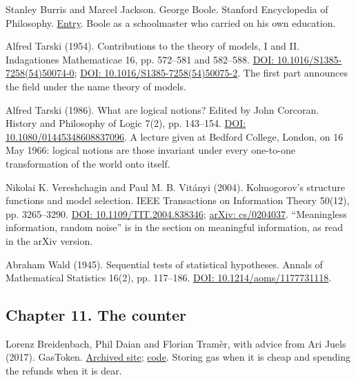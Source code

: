 \documentclass[11pt,twoside]{article}
\theoremstyle{thielethm}
\theoremstyle{thieledef}
\theoremstyle{thieledef}
\theoremstyle{thieledef}
\theoremstyle{thielethm}
\theoremstyle{thieleobs}
\theoremstyle{thielethm}
\begin{document}
\noindent Stanley Burris and Marcel Jackson. George Boole. Stanford Encyclopedia of Philosophy. \href{https://plato.stanford.edu/entries/boole/}{Entry}. Boole as a schoolmaster who carried on his own education.
\par\medskip

\noindent Alfred Tarski (1954). Contributions to the theory of models, I and II. Indagationes Mathematicae 16, pp. 572--581 and 582--588. \href{https://doi.org/10.1016/S1385-7258(54)50074-0}{DOI: 10.1016/S1385-7258(54)50074-0}; \href{https://doi.org/10.1016/S1385-7258(54)50075-2}{DOI: 10.1016/S1385-7258(54)50075-2}. The first part announces the field under the name theory of models.
\par\medskip

\noindent Alfred Tarski (1986). What are logical notions? Edited by John Corcoran. History and Philosophy of Logic 7(2), pp. 143--154. \href{https://doi.org/10.1080/01445348608837096}{DOI: 10.1080/01445348608837096}. A lecture given at Bedford College, London, on 16 May 1966: logical notions are those invariant under every one-to-one transformation of the world onto itself.
\par\medskip

\noindent Nikolai K. Vereshchagin and Paul M. B. Vit\'anyi (2004). Kolmogorov's structure functions and model selection. IEEE Transactions on Information Theory 50(12), pp. 3265--3290. \href{https://doi.org/10.1109/TIT.2004.838346}{DOI: 10.1109/TIT.2004.838346}; \href{https://arxiv.org/abs/cs/0204037}{arXiv: cs/0204037}. ``Meaningless information, random noise'' is in the section on meaningful information, as read in the arXiv version.
\par\medskip

\noindent Abraham Wald (1945). Sequential tests of statistical hypotheses. Annals of Mathematical Statistics 16(2), pp. 117--186. \href{https://doi.org/10.1214/aoms/1177731118}{DOI: 10.1214/aoms/1177731118}.
\par\medskip

\subsection*{Chapter 11. The counter}

\noindent Lorenz Breidenbach, Phil Daian and Florian Tram\`er, with advice from Ari Juels (2017). GasToken. \href{http://web.archive.org/web/20180308200043/https://gastoken.io/}{Archived site}; \href{https://github.com/projectchicago/gastoken}{code}. Storing gas when it is cheap and spending the refunds when it is dear.
\par\medskip
\end{document}

